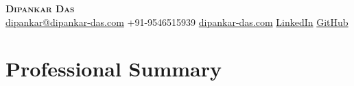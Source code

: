 \documentclass[a4paper,20pt]{article}
\begin{document}
\begin{center}
    \textbf{\Huge \scshape Dipankar Das} \\ \vspace{2pt}
    \href{mailto:dipankar@dipankar-das.com}{dipankar@dipankar-das.com} \quad \Large\textbar \quad
    +91-9546515939 \quad \Large\textbar \quad
    \href{https://dipankar-das.com/}{dipankar-das.com} \quad \Large\textbar \quad
    \href{https://www.linkedin.com/in/dipankar-das-1324b6206/}{LinkedIn} \quad \Large\textbar \quad
    \href{https://github.com/dipankardas011}{GitHub}
\end{center}


\section{Professional Summary}
\vspace{5pt}
\end{document}
